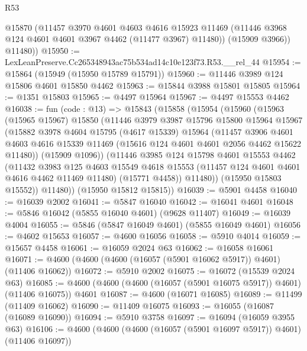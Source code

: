 \begin{lexlean}{R53}
\begin{coremodule}
          @15870
          (@11457
            @3970
            @4601
            @4603
            @4616
            @15923
            @11469
            (@11446 @3968 @124 @4601 @4601 @3967 @4462 (@11477 @3967) @11480))
          (@15909 @3966))
        @11480))
@15950 := LexLeanPreserve.Cc265348943ac75b534ad14c10e123f73.R53.__rel_44
@15954 := @15864 (@15949 (@15950 @15789 @15791))
@15960 := @11446 @3989 @124 @15806 @4601 @15850 @4462
@15963 := @15844 @3988 @15801 @15805
@15964 := @1351 @15803
@15965 := @4497 @15964
@15967 := @4497 @15553 @4462
@16038 := fun (code : @13) =>
  @15843
    (@15858
      (@15954
        (@15960
          (@15963
            (@15965 @15967)
            @15850
            (@11446
              @3979
              @3987
              @15796
              @15800
              @15964
              @15967
              (@15882
                @3978
                @4604
                @15795
                (@4617 @15339)
                @15964
                (@11457
                  @3906
                  @4601
                  @4603
                  @4616
                  @15339
                  @11469
                  (@15616 @124 @4601 @4601 @2056 @4462 @15622 @11480))
                (@15909 @1096))
              (@11446
                @3985
                @124
                @15798
                @4601
                @15553
                @4462
                (@11432
                  @3983
                  @125
                  @4603
                  @15549
                  @4618
                  @15553
                  (@11457 @124 @4601 @4601 @4616 @4462 @11469 @11480)
                  (@15771 @4458))
                @11480))
            (@15950 @15803 @15552))
          @11480))
      (@15950 @15812 @15815))
@16039 := @5901 @4458
@16040 := @16039 @2002
@16041 := @5847 @16040
@16042 := @16041 @4601
@16048 := @5846 @16042 (@5855 @16040 @4601) (@9628 @11407)
@16049 := @16039 @4004
@16055 := @5846 (@5847 @16049 @4601) (@5855 @16049 @4601)
@16056 := @4602 @15653
@16057 := @4600 @16056
@16058 := @5910 @4014
@16059 := @15657 @4458
@16061 := @16059 @2024 @63
@16062 := @16058 @16061
@16071 := @4600 (@4600 (@4600 (@16057 (@5901 @16062 @5917)) @4601) (@11406 @16062))
@16072 := @5910 @2002
@16075 := @16072 (@15539 @2024 @63)
@16085 := @4600 (@4600 (@4600 (@16057 (@5901 @16075 @5917)) @4601) (@11406 @16075)) @4601
@16087 := @4600 (@16071 @16085)
@16089 := @11499 (@11409 @16062)
@16090 := @11409 @16075
@16093 := @16055 (@16087 (@16089 @16090))
@16094 := @5910 @3758
@16097 := @16094 (@16059 @3955 @63)
@16106 := @4600 (@4600 (@4600 (@16057 (@5901 @16097 @5917)) @4601) (@11406 @16097))

\end{coremodule}
\end{lexlean}
